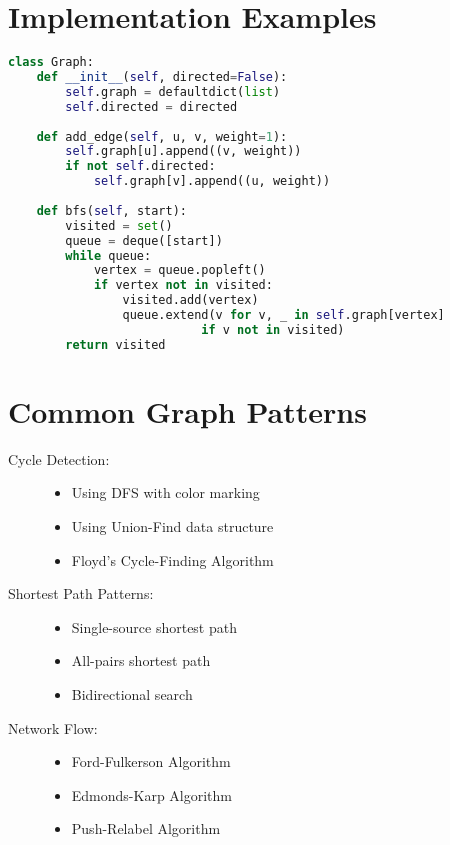 \section*{Implementation Examples}
\begin{lstlisting}[language=Python]
class Graph:
    def __init__(self, directed=False):
        self.graph = defaultdict(list)
        self.directed = directed
    
    def add_edge(self, u, v, weight=1):
        self.graph[u].append((v, weight))
        if not self.directed:
            self.graph[v].append((u, weight))
    
    def bfs(self, start):
        visited = set()
        queue = deque([start])
        while queue:
            vertex = queue.popleft()
            if vertex not in visited:
                visited.add(vertex)
                queue.extend(v for v, _ in self.graph[vertex] 
                           if v not in visited)
        return visited
\end{lstlisting}

\section*{Common Graph Patterns}
\begin{description}
    \item[Cycle Detection:] 
        \begin{itemize}
            \item Using DFS with color marking
            \item Using Union-Find data structure
            \item Floyd's Cycle-Finding Algorithm
        \end{itemize}
    
    \item[Shortest Path Patterns:] 
        \begin{itemize}
            \item Single-source shortest path
            \item All-pairs shortest path
            \item Bidirectional search
        \end{itemize}
        
    \item[Network Flow:] 
        \begin{itemize}
            \item Ford-Fulkerson Algorithm
            \item Edmonds-Karp Algorithm
            \item Push-Relabel Algorithm
        \end{itemize}
\end{description}

